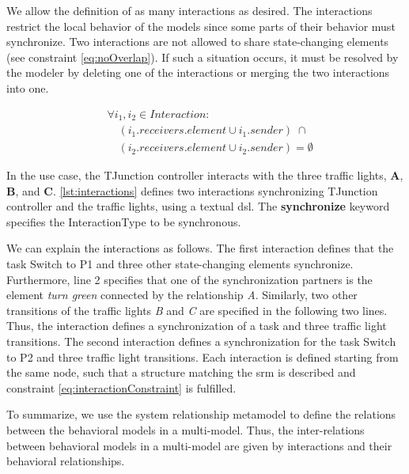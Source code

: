 \documentclass{jot}
\begin{document}
We allow the definition of as many interactions as desired.
The interactions restrict the local behavior of the models since some parts of their behavior must synchronize.
Two interactions are not allowed to share state-changing elements (see constraint \eqref{eq:noOverlap}).
If such a situation occurs, it must be resolved by the modeler by deleting one of the interactions or merging the two interactions into one.

\begin{equation} \label{eq:noOverlap}
    \begin{aligned}
    & \forall i_1,i_2 \in Interaction : \\
    & \quad (i_1.receivers.element \cup i_1.sender) \; \cap \\
    & \quad (i_2.receivers.element \cup i_2.sender) = \emptyset
    \end{aligned}
\end{equation}

In the use case, the TJunction controller interacts with the three traffic lights, \textbf{A}, \textbf{B}, and \textbf{C}.
\autoref{lst:interactions} defines two interactions synchronizing TJunction controller and the traffic lights, using a textual \gls*{dsl}.
The \textbf{synchronize} keyword specifies the \textsf{InteractionType} to be \textsf{synchronous}.



We can explain the interactions as follows.
The first interaction defines that the task \textsf{Switch to P1} and three other state-changing elements synchronize.
Furthermore, line 2 specifies that one of the synchronization partners is the element \emph{turn green} connected by the relationship \emph{A}.
Similarly, two other transitions of the traffic lights \emph{B} and \emph{C} are specified in the following two lines.
Thus, the interaction defines a synchronization of a task and three traffic light transitions. 
The second interaction defines a synchronization for the task \textsf{Switch to P2} and three traffic light transitions.
Each interaction is defined starting from the same node, such that a structure matching the \gls*{srm} is described and constraint \eqref{eq:interactionConstraint} is fulfilled.

To summarize, we use the system relationship metamodel to define the relations between the behavioral models in a multi-model.
Thus, the inter-relations between behavioral models in a multi-model are given by interactions and their behavioral relationships.
\end{document}
